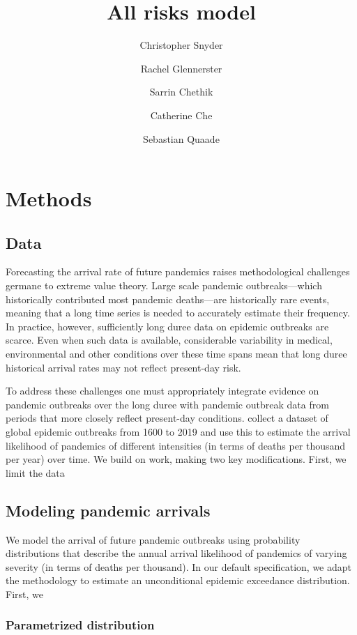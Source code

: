 \documentclass[12pt]{article}
\title{All risks model}
\author{Christopher Snyder \and Rachel Glennerster 
        \and Sarrin Chethik \and Catherine Che \and Sebastian Quaade}
\begin{document}
\maketitle

\begin{abstract}
\end{abstract}



\section{Methods}

\subsection{Data}
Forecasting the arrival rate of future pandemics raises methodological challenges germane to extreme value theory. Large scale pandemic outbreaks---which historically contributed most pandemic deaths---are historically rare events, meaning that a long time series is needed to accurately estimate their frequency. In practice, however, sufficiently long duree data on epidemic outbreaks are scarce. Even when such data is available, considerable variability in medical, environmental and other conditions over these time spans mean that long duree historical arrival rates may not reflect present-day risk. 

To address these challenges one must appropriately integrate evidence on pandemic outbreaks over the long duree with pandemic outbreak data from periods that more closely reflect present-day conditions. \textcite{marani_intensity_2021} collect a dataset of global epidemic outbreaks from 1600 to 2019 and use this to estimate the arrival likelihood of pandemics of different intensities (in terms of deaths per thousand per year) over time. We build on \textcite{marani_intensity_2021} work, making two key modifications. First, we limit the data 

\subsection{Modeling pandemic arrivals}

We model the arrival of future pandemic outbreaks using probability distributions that describe the annual arrival likelihood of pandemics of varying severity (in terms of deaths per thousand). In our default specification, we adapt the methodology \textcite{marani_intensity_2021} to estimate an unconditional epidemic exceedance distribution. First, we 

\subsubsection{Parametrized distribution}


\printbibliography
\end{document}

